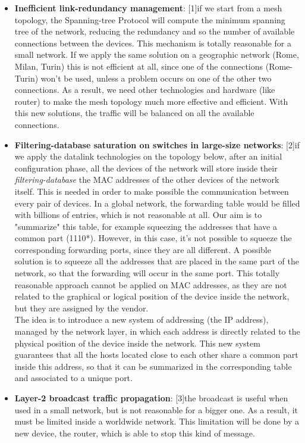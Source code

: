 \begin{itemize}
    \item \textbf{Inefficient link-redundancy management}: [1]if we start from a mesh topology, the Spanning-tree Protocol will compute the minimum spanning tree of the network, reducing the redundancy and so the number of available connections between the devices. This mechanism is totally reasonable for a small network. If we apply the same solution on a geographic network (Rome, Milan, Turin) this is not efficient at all, since one of the connections (Rome-Turin) won't be used, unless a problem occurs on one of the other two connections. As a result, we need other technologies and hardware (like router) to make the mesh topology much more effective and efficient. With this new solutions, the traffic will be balanced on all the available connections.
    \item \textbf{Filtering-database saturation on switches in large-size networks}: [2]if we apply the datalink technologies on the topology below, after an initial configuration phase, all the devices of the network will store inside their \textit{filtering-database} the MAC addresses of the other devices of the network itself. This is needed in order to make possible the communication between every pair of devices. In a global network, the forwarding table would be filled with billions of entries, which is not reasonable at all. Our aim is to "summarize" this table, for example squeezing the addresses that have a common part (1110*). However, in this case, it's not possible to squeeze the corresponding forwarding ports, since they are all different. A possible solution is to squeeze all the addresses that are placed in the same part of the network, so that the forwarding will occur in the same port. This totally reasonable approach cannot be applied on MAC addresses, as they are not related to the graphical or logical position of the device inside the network, but they are assigned by the vendor.\\The idea is to introduce a new system of addressing (the IP address), managed by the network layer, in which each address is directly related to the physical position of the device inside the network. This new system guarantees that all the hosts located close to each other share a common part inside this address, so that it can be summarized in the corresponding table and associated to a unique port.
    \item \textbf{Layer-2 broadcast traffic propagation}: [3]the broadcast is useful when used in a small network, but is not reasonable for a bigger one. As a result, it must be limited inside a worldwide network. This limitation will be done by a new device, the router, which is able to stop this kind of message.
\end{itemize}

